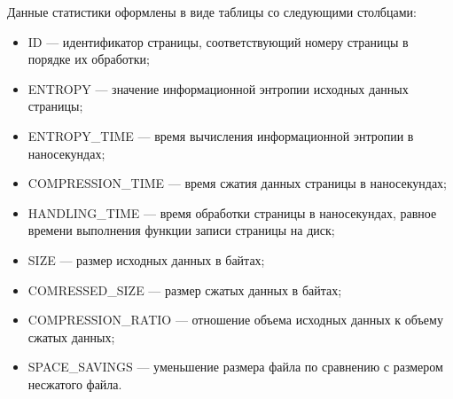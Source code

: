 Данные статистики оформлены в виде таблицы со следующими столбцами:

\begin{itemize}
    \item ID --- идентификатор страницы, соответствующий номеру страницы в порядке их обработки;
    \item ENTROPY --- значение информационной энтропии исходных данных страницы;
    \item ENTROPY\_TIME --- время вычисления информационной энтропии в наносекундах;
    \item COMPRESSION\_TIME --- время сжатия данных страницы в наносекундах;
    \item HANDLING\_TIME --- время обработки страницы в наносекундах, равное времени выполнения функции записи страницы на диск;
    \item SIZE --- размер исходных данных в байтах;
    \item COMRESSED\_SIZE --- размер сжатых данных в байтах;
    \item COMPRESSION\_RATIO --- отношение объема исходных данных к объему сжатых данных;
    \item SPACE\_SAVINGS --- уменьшение размера файла по сравнению с размером несжатого файла.
\end{itemize}